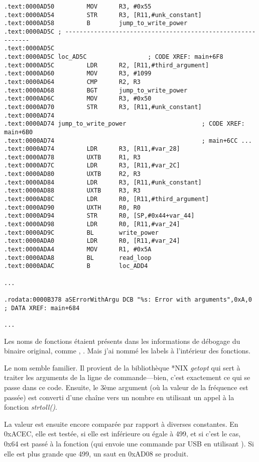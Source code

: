 \begin{lstlisting}[style=customasmARM]
.text:0000AD50         MOV      R3, #0x55
.text:0000AD54         STR      R3, [R11,#unk_constant]
.text:0000AD58         B        jump_to_write_power
.text:0000AD5C ; ------------------------------------------------------------
.text:0000AD5C
.text:0000AD5C loc_AD5C                 ; CODE XREF: main+6F8
.text:0000AD5C         LDR      R2, [R11,#third_argument]
.text:0000AD60         MOV      R3, #1099
.text:0000AD64         CMP      R2, R3
.text:0000AD68         BGT      jump_to_write_power
.text:0000AD6C         MOV      R3, #0x50
.text:0000AD70         STR      R3, [R11,#unk_constant]
.text:0000AD74
.text:0000AD74 jump_to_write_power                     ; CODE XREF: main+6B0
.text:0000AD74                                         ; main+6CC ...
.text:0000AD74         LDR      R3, [R11,#var_28]
.text:0000AD78         UXTB     R1, R3
.text:0000AD7C         LDR      R3, [R11,#var_2C]
.text:0000AD80         UXTB     R2, R3
.text:0000AD84         LDR      R3, [R11,#unk_constant]
.text:0000AD88         UXTB     R3, R3
.text:0000AD8C         LDR      R0, [R11,#third_argument]
.text:0000AD90         UXTH     R0, R0
.text:0000AD94         STR      R0, [SP,#0x44+var_44]
.text:0000AD98         LDR      R0, [R11,#var_24]
.text:0000AD9C         BL       write_power
.text:0000ADA0         LDR      R0, [R11,#var_24]
.text:0000ADA4         MOV      R1, #0x5A
.text:0000ADA8         BL       read_loop
.text:0000ADAC         B        loc_ADD4

...

.rodata:0000B378 aSErrorWithArgu DCB "%s: Error with arguments",0xA,0 ; DATA XREF: main+684

...

\end{lstlisting}

Les noms de fonctions étaient présents dans les informations de débogage du binaire
original, comme , .
Mais j'ai nommé les labels à l'intérieur des fonctions.

Le nom  semble familier. Il provient de la bibliothèque *NIX \emph{getopt}
qui sert à traiter les arguments de la ligne de commande---bien, c'est exactement
ce qui se passe dans ce code.
Ensuite, le 3ème argument (où la valeur de la fréquence est passée) est converti
d'une chaîne vers un nombre en utilisant un appel à la fonction \emph{strtoll()}.

La valeur est ensuite encore comparée par rapport à diverses constantes.
En 0xACEC, elle est testée, si elle est inférieure ou égale à 499, et si c'est le
cas, 0x64 est passé à la fonction  (qui envoie une commande par
USB en utilisant ).
Si elle est plus grande que 499, un saut en 0xAD08 se produit.

